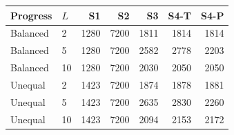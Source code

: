 \begin{tabular}{llrrrrr}\toprule
Progress & $L$ & S1 & S2 & S3 & S4-T & S4-P\\\midrule
Balanced & 2 & 1280 & 7200 & 1811 & 1814 & 1814\\
Balanced & 5 & 1280 & 7200 & 2582 & 2778 & 2203\\
Balanced & 10 & 1280 & 7200 & 2030 & 2050 & 2050\\
Unequal & 2 & 1423 & 7200 & 1874 & 1878 & 1881\\
Unequal & 5 & 1423 & 7200 & 2635 & 2830 & 2260\\
Unequal & 10 & 1423 & 7200 & 2094 & 2153 & 2172\\
\bottomrule\end{tabular}
